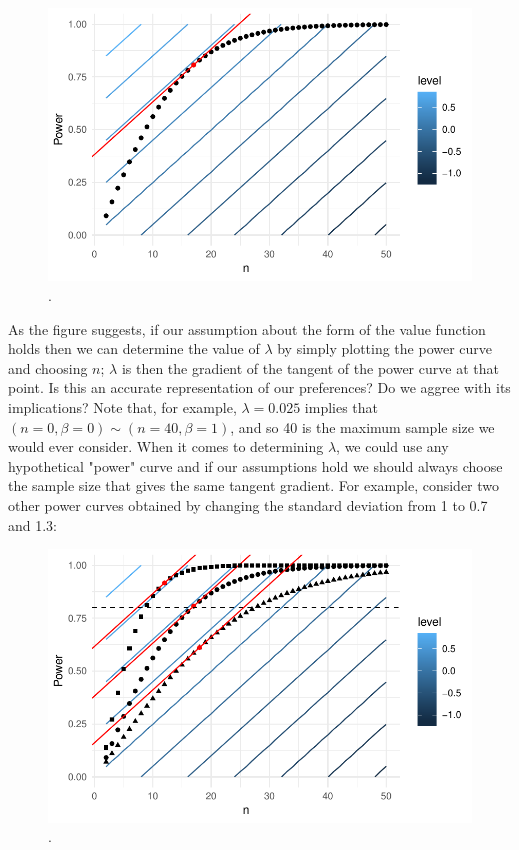 \documentclass[sagev]{sagej}
\begin{document}
\begin{figure}
\centering
\includegraphics[scale=0.8]{./figures/ex1_tangent}
\caption{.}
\label{fig:ex1_tangent}
\end{figure}

As the figure suggests, if our assumption about the form of the value function holds then we can determine the value of $\lambda$ by simply plotting the power curve and choosing $n$; $\lambda$ is then the gradient of the tangent of the power curve at that point. Is this an accurate representation of our preferences? Do we aggree with its implications? Note that, for example, $\lambda = 0.025$ implies that $(n=0, \beta=0) \sim (n=40, \beta=1)$, and so 40 is the maximum sample size we would ever consider. When it comes to determining $\lambda$, we could use any hypothetical "power" curve and if our assumptions hold we should always choose the sample size that gives the same tangent gradient. For example, consider two other power curves obtained by changing the standard deviation from 1 to 0.7 and 1.3:

\begin{figure}
\centering
\includegraphics[scale=0.8]{./figures/ex1_3tangents}
\caption{.}
\label{fig:ex1_3tangents}
\end{figure}
\end{document}
